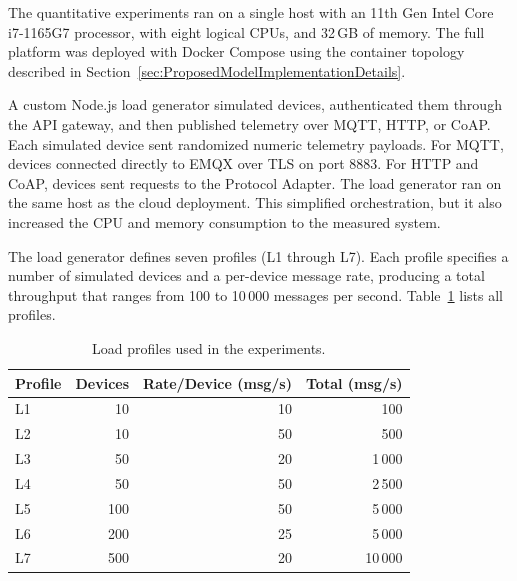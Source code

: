 The quantitative experiments ran on a single host with an 11th Gen Intel Core i7-1165G7 processor, with eight logical \glspl{CPU}, and 32\,GB of memory. The full platform was deployed with Docker Compose using the container topology described in Section~\ref{sec:ProposedModelImplementationDetails}.

A custom Node.js load generator simulated devices, authenticated them through the \gls{API} gateway, and then published telemetry over \gls{MQTT}, \gls{HTTP}, or \gls{CoAP}. Each simulated device sent randomized numeric telemetry payloads. For \gls{MQTT}, devices connected directly to EMQX over TLS on port 8883. For \gls{HTTP} and \gls{CoAP}, devices sent requests to the Protocol Adapter. The load generator ran on the same host as the cloud deployment. This simplified orchestration, but it also increased the CPU and memory consumption to the measured system.

The load generator defines seven profiles (L1 through L7). Each profile specifies a number of simulated devices and a per-device message rate, producing a total throughput that ranges from 100 to 10\,000 messages per second. Table~\ref{tab:load-profiles} lists all profiles.

\begin{table}[htbp]
    \centering
    \caption{Load profiles used in the experiments.}
    \label{tab:load-profiles}
    \small
    \begin{tabular}{l r r r}
        \toprule
        \textbf{Profile} & \textbf{Devices} & \textbf{Rate/Device (msg/s)} & \textbf{Total (msg/s)} \\
        \midrule
        L1               & 10               & 10                           & 100                    \\
        L2               & 10               & 50                           & 500                    \\
        L3               & 50               & 20                           & 1\,000                 \\
        L4               & 50               & 50                           & 2\,500                 \\
        L5               & 100              & 50                           & 5\,000                 \\
        L6               & 200              & 25                           & 5\,000                 \\
        L7               & 500              & 20                           & 10\,000                \\
        \bottomrule
    \end{tabular}
\end{table}

